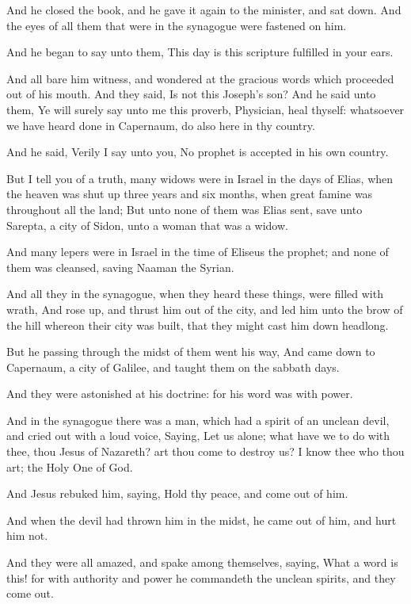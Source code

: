 \Verse And he closed the book, and he gave it again to the minister, and sat down. And the eyes of all them that were in the synagogue were fastened on him.

\Verse And he began to say unto them, This day is this scripture fulfilled in your ears.

\Verse And all bare him witness, and wondered at the gracious words which proceeded out of his mouth. And they said, Is not this Joseph's son?  \Verse And he said unto them, Ye will surely say unto me this proverb, Physician, heal thyself: whatsoever we have heard done in Capernaum, do also here in thy country.

\Verse And he said, Verily I say unto you, No prophet is accepted in his own country.

\Verse But I tell you of a truth, many widows were in Israel in the days of Elias, when the heaven was shut up three years and six months, when great famine was throughout all the land; \Verse But unto none of them was Elias sent, save unto Sarepta, a city of Sidon, unto a woman that was a widow.

\Verse And many lepers were in Israel in the time of Eliseus the prophet; and none of them was cleansed, saving Naaman the Syrian.

\Verse And all they in the synagogue, when they heard these things, were filled with wrath, \Verse And rose up, and thrust him out of the city, and led him unto the brow of the hill whereon their city was built, that they might cast him down headlong.

\Verse But he passing through the midst of them went his way, \Verse And came down to Capernaum, a city of Galilee, and taught them on the sabbath days.

\Verse And they were astonished at his doctrine: for his word was with power.

\Verse And in the synagogue there was a man, which had a spirit of an unclean devil, and cried out with a loud voice, \Verse Saying, Let us alone; what have we to do with thee, thou Jesus of Nazareth? art thou come to destroy us? I know thee who thou art; the Holy One of God.

\Verse And Jesus rebuked him, saying, Hold thy peace, and come out of him.

And when the devil had thrown him in the midst, he came out of him, and hurt him not.

\Verse And they were all amazed, and spake among themselves, saying, What a word is this! for with authority and power he commandeth the unclean spirits, and they come out.

